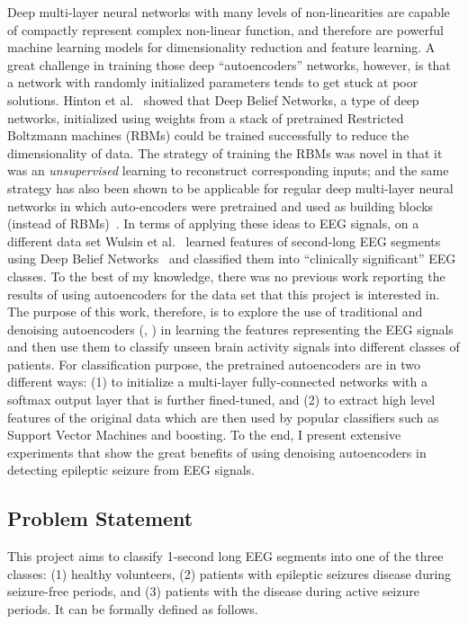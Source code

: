 \documentclass[12pt]{article}
\begin{document}
Deep multi-layer neural networks with many levels of non-linearities are capable of compactly represent complex non-linear function, and therefore are powerful machine learning models for dimensionality reduction and feature learning. A great challenge in training those deep ``autoencoders'' networks, however, is that a network with randomly initialized parameters tends to get stuck at poor solutions. Hinton et al.~\cite{hinton2006reducing} showed that Deep Belief Networks, a type of deep networks, initialized using weights from a stack of pretrained Restricted Boltzmann machines (RBMs) could be trained successfully to reduce the dimensionality of data. The strategy of training the RBMs was novel in that it was an \emph{unsupervised} learning to reconstruct corresponding inputs; and the same strategy has also been shown to be applicable for regular deep multi-layer neural networks in which auto-encoders were pretrained and used as building blocks (instead of RBMs)~\cite{bengio2007greedy}. In terms of applying these ideas to EEG signals, on a different data set Wulsin et al.~\cite{wulsin2011modeling} learned features of second-long EEG segments using Deep Belief Networks~\cite{hinton2006reducing} and classified them into ``clinically significant'' EEG classes. To the best of my knowledge, there was no previous work reporting the results of using autoencoders for the data set that this project is interested in. The purpose of this work, therefore, is to explore the use of traditional and denoising autoencoders (\cite{bengio2007greedy}, \cite{vincent2010stacked}) in learning the features representing the EEG signals and then use them to classify unseen brain activity signals into different classes of patients. For classification purpose, the pretrained autoencoders are in two different ways: (1) to initialize a multi-layer fully-connected networks with a softmax output layer that is further fined-tuned, and (2) to extract high level features of the original data which are then used by popular classifiers such as Support Vector Machines and boosting. To the end, I present extensive experiments that show the great benefits of using denoising autoencoders in detecting epileptic seizure from EEG signals.

\subsection{Problem Statement}
\noindent
This project aims to classify 1-second long EEG segments into one of the three classes: (1) healthy volunteers, (2) patients with epileptic seizures disease during seizure-free periods, and (3) patients with the disease during active seizure periods. It can be formally defined as follows.
\end{document}
